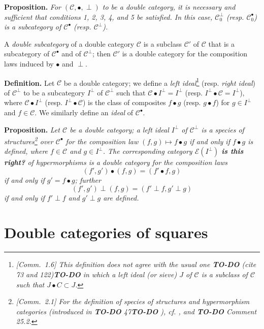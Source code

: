 \documentclass{article}
\newenvironment{itenv}[1]
  {\phantomsection\par\medskip\noindent\textbf{#1.}\itshape}
  {\par\medskip}
\newenvironment{rmenv}[1]
  {\phantomsection\par\medskip\noindent\textbf{#1.}\rmfamily}
  {\par\medskip}
\newcommand{\oldpage}[1]{\marginpar{\footnotesize$\Big\vert$ \textit{p.~#1}}}
\newcommand{\todo}{{\color{purple}\textbf{TO-DO }}}
\newcommand{\unsure}[1]{{\color{purple}\textbf{#1}}}
\newcommand{\CC}{\mathcal{C}}
\begin{document}
\begin{itenv}{Proposition}
  For $(\CC,\bullet,\perp)$ to be a double category, it is necessary and sufficient that conditions 1, 2, 3\textquotesingle, 4\textquotesingle, and 5 be satisfied.
  In this case, $\CC_0^\perp$ (resp. $\CC_0^\bullet$) is a subcategory of $\CC^\bullet$ (resp. $\CC^\perp$).
\end{itenv}

A \emph{double subcategory} of a double category $\CC$ is a subclass $\CC'$ of $\CC$ that is a subcategory of $\CC^\bullet$ and of $\CC^\perp$;
then $\CC'$ is a double category for the composition laws induced by $\bullet$ and $\perp$.

\begin{rmenv}{Definition}
  Let $\CC$ be a double category;
  we define a \emph{left ideal}\footnote{\emph{[Comm.~1.6] This definition does not agree with the usual one \todo(cite 73 and 122)\todo in which a left ideal (or \emph{sieve}) $J$ of $\CC$ is a subclass of $\CC$ such that $J\bullet C\subset J$.}} (resp. \emph{right ideal}) of $\CC^\perp$ to be a subcategory $I^\perp$ of $\CC^\perp$ such that $\CC\bullet I^\perp=I^\perp$ (resp. $I^\perp\bullet\CC=I^\perp$), where $\CC\bullet I^\perp$ (resp. $I^\perp\bullet\CC$) is the class of composites $f\bullet g$ (resp. $g\bullet f$) for $g\in I^\perp$ and $f\in\CC$.
  We similarly define an \emph{ideal} of $\CC^\bullet$.
\end{rmenv}

\oldpage{1199}

\begin{itenv}{Proposition}
  Let $\CC$ be a double category;
  a left ideal $I^\perp$ of $\CC^\perp$ is a species of structures\footnote{\emph{[Comm.~2.1] For the definition of species of structures and hypermorphism categories (introduced in \todo{47}\todo), cf. \cite[\S~I, 2--3]{CW63}, and \todo Comment 25.2.}} \cite{1} over $\CC^\bullet$ for the composition law $(f,g)\mapsto f\bullet g$ if and only if $f\bullet g$ is defined, where $f\in\CC$ and $g\in I^\perp$.
  The corresponding category $\mathscr{E}(I^\perp)$ \unsure{is this right?} of hypermorphisms \cite{1} is a double category for the composition laws
  \[
    (f',g')\bullet(f,g)
    = (f'\bullet f,g)
  \]
  if and only if $g'=f\bullet g$; further
  \[
    (f',g')\perp(f,g)
    = (f'\perp f,g'\perp g)
  \]
  if and only if $f'\perp f$ and $g'\perp g$ are defined.
\end{itenv}


\section{Double categories of squares}
\end{document}
